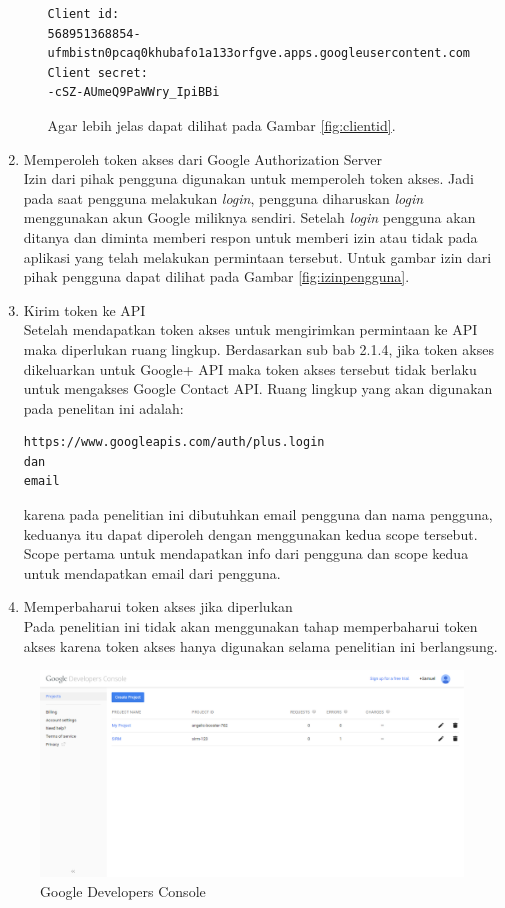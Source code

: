 \begin{enumerate}[(1)]
\begin{enumerate}
\begin{lstlisting}[basicstyle=\footnotesize]
Client id:
568951368854-ufmbistn0pcaq0khubafo1a133orfgve.apps.googleusercontent.com
Client secret:
-cSZ-AUmeQ9PaWWry_IpiBBi
\end{lstlisting}
Agar lebih jelas dapat dilihat pada Gambar \ref{fig:clientid}.
    \end{enumerate}
\item Memperoleh token akses dari Google Authorization Server\\
Izin dari pihak pengguna digunakan untuk memperoleh token akses. Jadi pada saat pengguna melakukan {\it login}, pengguna diharuskan {\it login} menggunakan akun Google miliknya sendiri. Setelah {\it login} pengguna akan ditanya dan diminta memberi respon untuk memberi izin atau tidak pada aplikasi yang telah melakukan permintaan tersebut. Untuk gambar izin dari pihak pengguna dapat dilihat pada Gambar \ref{fig:izinpengguna}.
\item Kirim token ke API\\
Setelah mendapatkan token akses untuk mengirimkan permintaan ke API maka diperlukan ruang lingkup. Berdasarkan sub bab 2.1.4, jika token akses dikeluarkan untuk Google+ API maka token akses tersebut tidak berlaku untuk mengakses Google Contact API. Ruang lingkup yang akan digunakan pada penelitan ini adalah:
\begin{lstlisting}[basicstyle=\footnotesize]
https://www.googleapis.com/auth/plus.login
dan
email
\end{lstlisting}
karena pada penelitian ini dibutuhkan email pengguna dan nama pengguna, keduanya itu dapat diperoleh dengan menggunakan kedua scope tersebut. Scope pertama untuk mendapatkan info dari pengguna dan scope kedua untuk mendapatkan email dari pengguna.
\item Memperbaharui token akses jika diperlukan\\
Pada penelitian ini tidak akan menggunakan tahap memperbaharui token akses
karena token akses hanya digunakan selama penelitian ini berlangsung.
\end{enumerate}

\begin{figure}[p]
\centering
\includegraphics[scale=0.4]{Gambar/GDC.png}
\caption[Google Developers Console]{Google Developers Console} 
\label{fig:gdc}
\end{figure}

